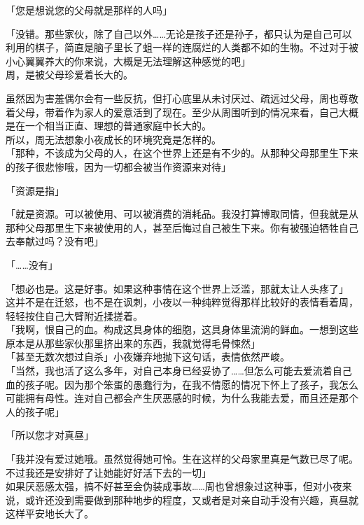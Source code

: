 「您是想说您的父母就是那样的人吗」

「没错。那些家伙，除了自己以外……无论是孩子还是孙子，都只认为是自己可以利用的棋子，简直是脑子里长了蛆一样的连腐烂的人类都不如的生物。不过对于被小心翼翼养大的你来说，大概是无法理解这种感觉的吧」\\

周，是被父母珍爱着长大的。

虽然因为害羞偶尔会有一些反抗，但打心底里从未讨厌过、疏远过父母，周也尊敬着父母，带着作为家人的爱意活到了现在。至少从周围听到的情况来看，自己大概是在一个相当正直、理想的普通家庭中长大的。\\

所以，周无法想象小夜成长的环境究竟是怎样的。\\

「那种，不该成为父母的人，在这个世界上还是有不少的。从那种父母那里生下来的孩子很悲惨哦，因为一切都会被当作资源来对待」

「资源是指」

「就是资源。可以被使用、可以被消费的消耗品。我没打算博取同情，但我就是从那种父母那里生下来被使用的人，甚至后悔过自己被生下来。你有被强迫牺牲自己去奉献过吗？没有吧」

「……没有」

「想必也是。这是好事。如果这种事情在这个世界上泛滥，那就太让人头疼了」\\

这并不是在迁怒，也不是在讽刺，小夜以一种纯粹觉得那样比较好的表情看着周，轻轻按住自己大臂附近揉搓着。\\

「我啊，恨自己的血。构成这具身体的细胞，这具身体里流淌的鲜血。一想到这些原本是从那些家伙那里挤出来的东西，我就觉得毛骨悚然」\\

「甚至无数次想过自杀」小夜嫌弃地抛下这句话，表情依然严峻。\\

「当然，我也活了这么多年，对自己本身已经妥协了……但怎么可能去爱流着自己血的孩子呢。因为那个笨蛋的愚蠢行为，在我不情愿的情况下怀上了孩子，我怎么可能拥有母性。连对自己都会产生厌恶感的时候，为什么我能去爱，而且还是那个人的孩子呢」

「所以您才对真昼」

「我并没有爱过她哦。虽然觉得她可怜。生在这样的父母家里真是气数已尽了呢。不过我还是安排好了让她能好好活下去的一切」\\

如果厌恶感太强，搞不好甚至会伪装成事故……周也曾想象过这种事，但对小夜来说，或许还没到需要做到那种地步的程度，又或者是对亲自动手没有兴趣，真昼就这样平安地长大了。\\

